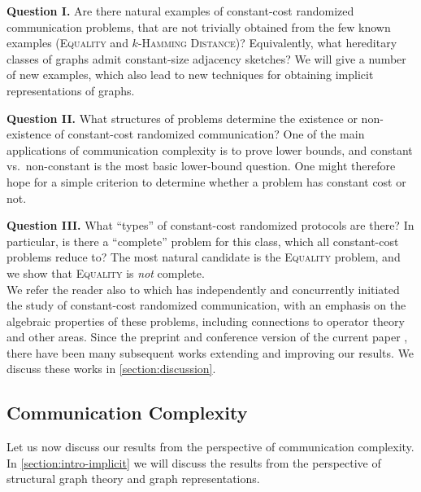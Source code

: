 \documentclass{article}
\begin{document}
\vspace{0.75em}\noindent\textbf{Question I.}
Are there natural examples of constant-cost randomized communication problems, that are not
trivially obtained from the few known examples (\textsc{Equality} and $k$-\textsc{Hamming
Distance})?  Equivalently, what hereditary classes of graphs admit constant-size adjacency sketches?
We will give a number of new examples, which also lead to new 
techniques for obtaining implicit representations of graphs.

\vspace{0.75em}\noindent\textbf{Question II.}
What structures of problems determine the existence or non-existence of constant-cost randomized
communication? One of the main applications of communication complexity is to prove lower bounds,
and constant vs.~non-constant is the most basic lower-bound question. One might therefore hope for a
simple criterion to determine whether a problem has constant cost or not.

\vspace{0.75em}\noindent\textbf{Question III.}
What ``types'' of constant-cost randomized protocols are there? In particular,
is there a ``complete'' problem for this class, which all constant-cost problems reduce to? The most
natural candidate is the \textsc{Equality} problem, and we show that \textsc{Equality} is \emph{not}
complete.\\

We refer the reader also to \cite{HHH23dimfree} which has independently and concurrently initiated
the study of constant-cost randomized communication, with an emphasis on the algebraic properties of
these problems, including connections to operator theory and other areas. Since the preprint and
conference version of the current paper \cite{HWZ22}, there have been many subsequent works
extending and improving our results. We discuss these works in \cref{section:discussion}.

\subsection{Communication Complexity}
\label{section:intro-communication}

Let us now discuss our results from the perspective of communication complexity. In
\cref{section:intro-implicit} we will discuss the results from the perspective of structural graph
theory and graph representations.
\end{document}
